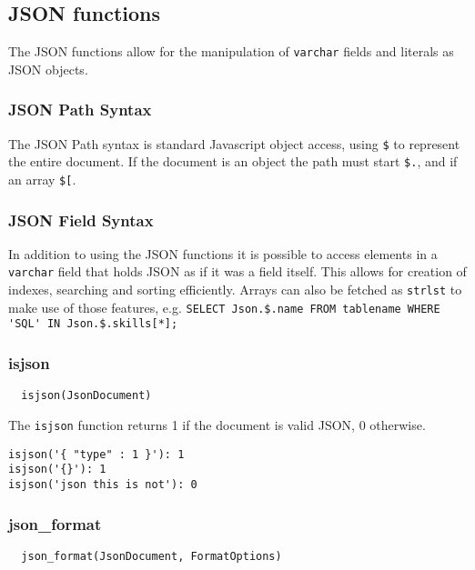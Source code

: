 \subsection{JSON functions}

The JSON functions allow for the manipulation of \verb`varchar` fields
and literals as JSON objects.

\subsubsection{JSON Path Syntax}
The JSON Path syntax is standard Javascript object access, using \verb`$` to
represent the entire document.  If the document is an object the path must
start \verb`$.`, and if an array \verb`$[`.

\subsubsection{JSON Field Syntax}
\label{jsoncomputedfield}
In addition to using the JSON functions it is possible to access elements
in a \verb`varchar` field that holds JSON as if it was a field itself.
This allows for creation of indexes, searching and sorting efficiently.
Arrays can also be fetched as \verb`strlst` to make use of those features,
e.g. \verb`SELECT Json.$.name FROM tablename WHERE 'SQL' IN Json.$.skills[*];`

\subsubsection{isjson}

\begin{verbatim}
  isjson(JsonDocument)
\end{verbatim}

The \verb`isjson` function returns 1 if the document is valid JSON,
0 otherwise.

\begin{verbatim}
isjson('{ "type" : 1 }'): 1
isjson('{}'): 1
isjson('json this is not'): 0
\end{verbatim}

\subsubsection{json\_format}

\begin{verbatim}
  json_format(JsonDocument, FormatOptions)
\end{verbatim}


